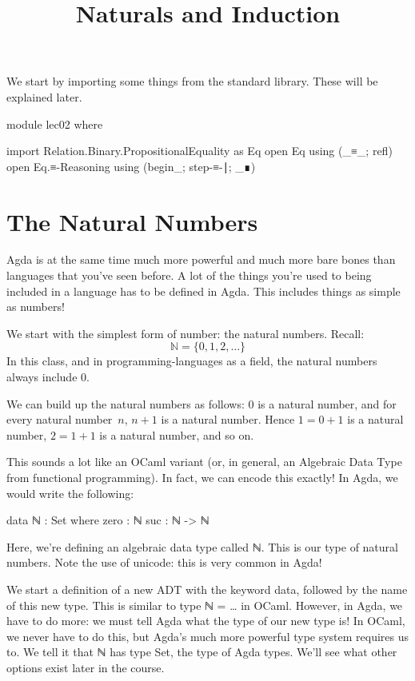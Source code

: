 \documentclass{lecturenotes}
\title{Naturals and Induction}
\newcommand{\agdanats}{\textsf{ℕ}\xspace}
\begin{document}
\maketitle

We start by importing some things from the standard library.
These will be explained later.
\begin{center}
\begin{code}
  module lec02 where
  
  import Relation.Binary.PropositionalEquality as Eq
  open Eq using (_≡_; refl)
  open Eq.≡-Reasoning using (begin_; step-≡-∣; _∎)
\end{code}
\end{center}

\section{The Natural Numbers}
\label{sec:natural-numbers}

Agda is at the same time much more powerful and much more bare bones than languages that you've seen before.
A lot of the things you're used to being included in a language has to be defined in Agda.
This includes things as simple as numbers!

We start with the simplest form of number: the natural numbers.
Recall: $$\mathbb{N} = \{0, 1, 2, \dots\}$$
In this class, and in programming-languages as a field, the natural numbers always include $0$.

We can build up the natural numbers as follows: $0$ is a natural number, and for every natural number~$n$, $n + 1$ is a natural number.
Hence $1 = 0 + 1$ is a natural number, $2 = 1 + 1$ is a natural number, and so on.

This sounds a lot like an OCaml variant (or, in general, an Algebraic Data Type from functional programming).
In fact, we can encode this exactly!
In Agda, we would write the following:
\begin{center}
\begin{code}
  data ℕ : Set where
    zero : ℕ
    suc : ℕ -> ℕ
\end{code}
\end{center}
Here, we're defining an algebraic data type called \agdanats.
This is our type of natural numbers.
Note the use of unicode: this is very common in Agda!

We start a definition of a new ADT with the keyword \textsf{data}, followed by the name of this new type.
This is similar to \textsf{type ℕ = \dots} in OCaml.
However, in Agda, we have to do more: we must tell Agda what the type of our new type is!
In OCaml, we never have to do this, but Agda's much more powerful type system requires us to.
We tell it that \agdanats has type \textsf{Set}, the type of Agda types.
We'll see what other options exist later in the course.
\end{document}
